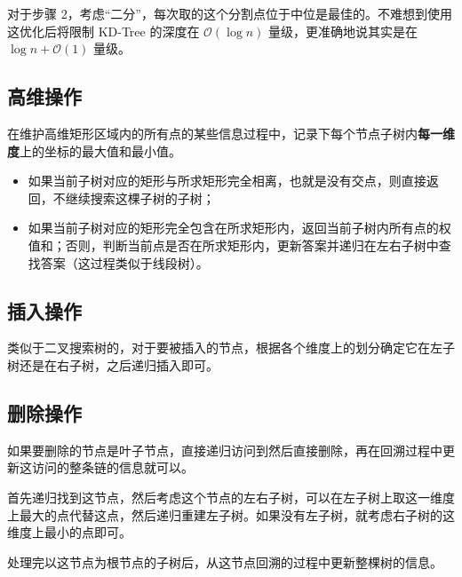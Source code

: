对于步骤 $2$，考虑“二分”，每次取的这个分割点位于中位是最佳的。不难想到使用这优化后将限制 KD-Tree 的深度在 $\mathcal O\left(\log n\right)$ 量级，更准确地说其实是在 $\log n + \mathcal O(1)$ 量级。

\subsection{高维操作}

在维护高维矩形区域内的所有点的某些信息过程中，记录下每个节点子树内\textbf{每一维度}上的坐标的最大值和最小值。

\begin{itemize}
\item 如果当前子树对应的矩形与所求矩形完全相离，也就是没有交点，则直接返回，不继续搜索这棵子树的子树；

\item 如果当前子树对应的矩形完全包含在所求矩形内，返回当前子树内所有点的权值和；否则，判断当前点是否在所求矩形内，更新答案并递归在左右子树中查找答案（这过程类似于线段树）。
\end{itemize}

\subsection{插入操作}

类似于二叉搜索树的，对于要被插入的节点，根据各个维度上的划分确定它在左子树还是在右子树，之后递归插入即可。

\subsection{删除操作}
如果要删除的节点是叶子节点，直接递归访问到然后直接删除，再在回溯过程中更新这访问的整条链的信息就可以。

首先递归找到这节点，然后考虑这个节点的左右子树，可以在左子树上取这一维度上最大的点代替这点，然后递归重建左子树。如果没有左子树，就考虑右子树的这维度上最小的点即可。

处理完以这节点为根节点的子树后，从这节点回溯的过程中更新整棵树的信息。

